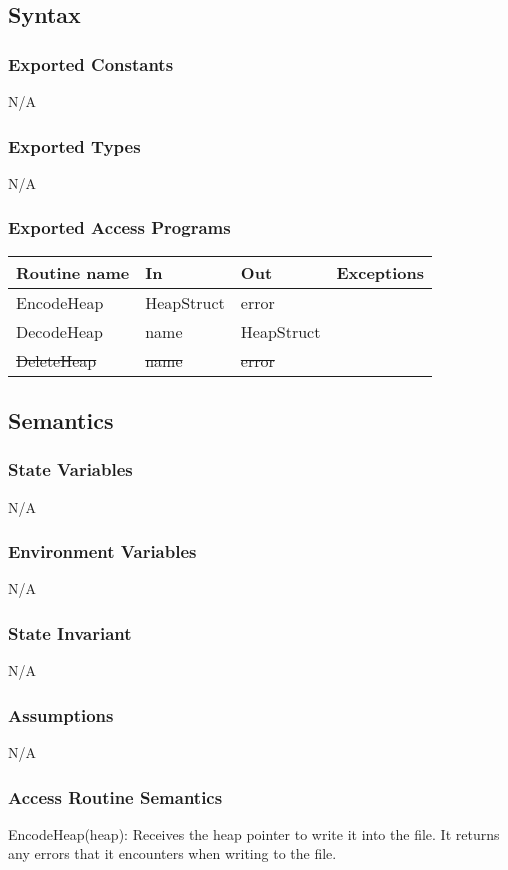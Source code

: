 \documentclass[12pt]{article}
\begin{document}
\subsection {Syntax}

\subsubsection {Exported Constants}
N/A
\subsubsection {Exported Types}
N/A
\subsubsection {Exported Access Programs}

\begin{tabular}{| l | l | l | l |}
\hline
\textbf{Routine name} & \textbf{In} & \textbf{Out} & \textbf{Exceptions}\\
\hline
EncodeHeap & HeapStruct & error & \\
\hline
DecodeHeap & name & HeapStruct & \\
\hline
\sout{DeleteHeap} & \sout{name} & \sout{error} & \\
\hline
\end{tabular}

\subsection {Semantics}

\subsubsection {State Variables}
N/A
\subsubsection {Environment Variables}
N/A
\subsubsection {State Invariant}
N/A
\subsubsection {Assumptions}
N/A

\subsubsection{Access Routine Semantics}
\noindent EncodeHeap(heap): Receives the heap pointer to write it into the file. It returns any errors that it encounters when writing to the file. \\
\end{document}
